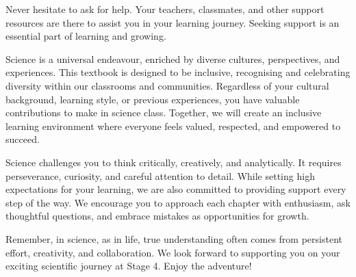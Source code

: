 Never hesitate to ask for help. Your teachers, classmates, and other support resources are there to assist you in your learning journey. Seeking support is an essential part of learning and growing.

\FloatBarrier

\FloatBarrier
\1

Science is a universal endeavour, enriched by diverse cultures, perspectives, and experiences. This textbook is designed to be inclusive, recognising and celebrating diversity within our classrooms and communities. Regardless of your cultural background, learning style, or previous experiences, you have valuable contributions to make in science class. Together, we will create an inclusive learning environment where everyone feels valued, respected, and empowered to succeed.

\FloatBarrier
\1

Science challenges you to think critically, creatively, and analytically. It requires perseverance, curiosity, and careful attention to detail. While setting high expectations for your learning, we are also committed to providing support every step of the way. We encourage you to approach each chapter with enthusiasm, ask thoughtful questions, and embrace mistakes as opportunities for growth. 

Remember, in science, as in life, true understanding often comes from persistent effort, creativity, and collaboration. We look forward to supporting you on your exciting scientific journey at Stage 4. Enjoy the adventure!

\FloatBarrier